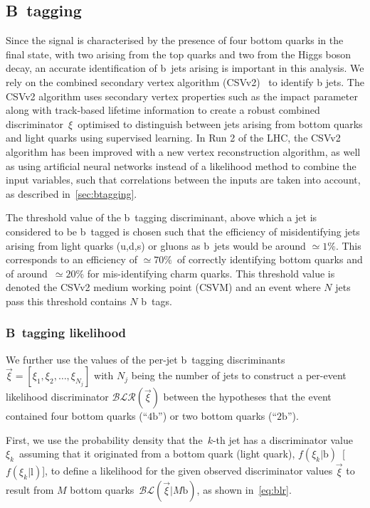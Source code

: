 \subsection{B~tagging}
\label{sec:object_id_btag}

Since the \ttHbb\xspace signal is characterised by the presence of four bottom quarks in the final state, with two arising from the top quarks and two from the Higgs boson decay, an accurate identification of b~jets arising is important in this analysis. We rely on the combined secondary vertex algorithm (CSVv2)~\cite{Chatrchyan:2012jua} to identify b jets. The CSVv2 algorithm uses secondary vertex properties such as the impact parameter along with track-based lifetime information to create a robust combined discriminator~$\xi$~optimised to distinguish between jets arising from bottom quarks and light quarks using supervised learning. In Run 2 of the LHC, the CSVv2 algorithm has been improved with a new vertex reconstruction algorithm, as well as using artificial neural networks instead of a likelihood method to combine the input variables, such that correlations between the inputs are taken into account, as described in~\cref{sec:btagging}.

The threshold value of the b~tagging discriminant, above which a jet is considered to be b~tagged is chosen such that the efficiency of misidentifying jets arising from light quarks (u,d,s) or gluons as b~jets would be around $\simeq1\%$. This corresponds to an efficiency of $\simeq70\%$~of correctly identifying bottom quarks and of around~$\simeq20\%$ for mis-identifying charm quarks. This threshold value is denoted the CSVv2 medium working point (CSVM) and an event where $N$ jets pass this threshold contains $N$ b~tags.

\subsubsection{B~tagging likelihood}
We further use the values of the per-jet b~tagging discriminants~$\vec{\xi} = [\xi_1, \xi_2, \dots, \xi_{N_j}]$ with $N_j$ being the number of jets to construct a per-event likelihood discriminator $\mathcal{BLR}(\vec{\xi})$ between the hypotheses that the event contained four bottom quarks (``$4\mathrm{b}$'') or two bottom quarks (``$2\mathrm{b}$'').

First, we use the probability density that the~$k$-th jet has a discriminator value~$\xi_k$~assuming that it originated from a bottom quark (light quark), $f(\xi_k | \mathrm{b})$~[$f(\xi_k | \mathrm{l})$], to define a likelihood for the given observed discriminator values $\vec{\xi}$ to result from $M$ bottom quarks~$\mathcal{BL}(\vec{\xi} | M\mathrm{b})$, as shown in~\cref{eq:blr}.

